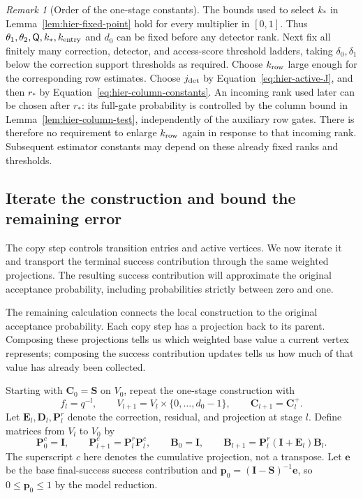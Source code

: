 \documentclass[11pt]{article}
\numberwithin{equation}{section}
\theoremstyle{definition}
\theoremstyle{remark}
\newtheorem{remark}[theorem]{Remark}
\begin{document}
\begin{remark}[Order of the one-stage constants]
\label{rem:hier-constant-order}
The bounds used to select $k_*$ in
Lemma~\ref{lem:hier-fixed-point} hold for every multiplier in $[0,1]$.
Thus $\theta_1,\theta_2,{\mathsf{Q}},k_*,{k_{\rm entry}}$ and ${d}_0$ can be fixed before any
detector rank.  Next fix all finitely many correction, detector, and
access-score threshold ladders, taking $\delta_0,\delta_1$ below the
correction support thresholds as required.  Choose ${k_{\rm row}}$ large enough for
the corresponding row estimates.  Choose ${j_{\rm det}}$ by
Equation~\eqref{eq:hier-active-J}, and then ${r}_*$ by
Equation~\eqref{eq:hier-column-constants}.  An incoming rank used later
can be chosen after ${r}_*$: its full-gate probability is controlled by
the column bound in Lemma~\ref{lem:hier-column-test}, independently of
the auxiliary row gates.  There is therefore no requirement to enlarge
${k_{\rm row}}$ again in response to that incoming rank.  Subsequent estimator
constants may depend on these already fixed ranks and thresholds.
\end{remark}

\subsection{Iterate the construction and bound the remaining error}

The copy step controls transition entries and active vertices.  We now
iterate it and transport the terminal success contribution through the same weighted
projections.  The resulting success contribution will approximate the original
acceptance probability, including probabilities strictly between zero
and one.

The remaining calculation connects the local construction to the original acceptance probability. Each copy step has a projection back to its parent. Composing these projections tells us which weighted base value a current vertex represents; composing the success contribution updates tells us how much of that value has already been collected.

Starting with ${\mathbf{C}}_0={\mathbf{S}}$ on $V_0$, repeat the one-stage construction with
\[
 f_l=q^{-l},\qquad
 V_{l+1}=V_l\times\{0,\ldots,{d}_0-1\},\qquad {\mathbf{C}}_{l+1}={\mathbf{C}}_l^+.
\]
Let ${\mathbf{E}}_l,{\mathbf{D}}_l,{\mathbf{P}}_l^r$ denote the correction, residual, and projection at
stage $l$.  Define matrices from $V_l$ to $V_0$ by
\begin{equation}
 {\mathbf{P}}_0^c={\mathbf{I}},\qquad {\mathbf{P}}_{l+1}^c={\mathbf{P}}_l^r{\mathbf{P}}_l^c,
 \qquad {\mathbf{B}}_0={\mathbf{I}},\qquad {\mathbf{B}}_{l+1}={\mathbf{P}}_l^r({\mathbf{I}}+{\mathbf{E}}_l){\mathbf{B}}_l.
 \label{eq:hier-cumulative-matrices}
\end{equation}
The superscript $c$ here denotes the cumulative projection, not a
transpose.  Let ${\mathbf{e}}$ be the base final-success success contribution and
${\mathbf{p}}_0=({\mathbf{I}}-{\mathbf{S}})^{-1}{\mathbf{e}}$, so $0\leq {\mathbf{p}}_0\leq1$ by the model reduction.
\end{document}
